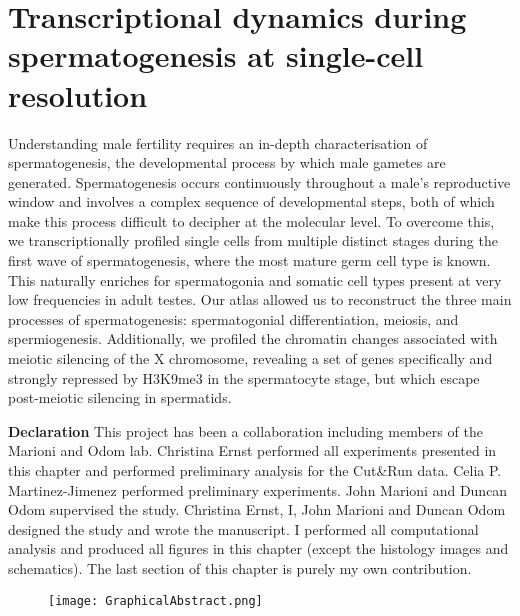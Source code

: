 
\chapter{Transcriptional dynamics during spermatogenesis at single-cell resolution}  

\graphicspath{{Chapter3/Figures/}}

\begin{Abstract}
Understanding male fertility requires an in-depth characterisation of spermatogenesis, the developmental process by which male gametes are generated. Spermatogenesis occurs continuously throughout a male’s reproductive window and involves a complex sequence of developmental steps, both of which make this process difficult to decipher at the molecular level. To overcome this, we transcriptionally profiled single cells from multiple distinct stages during the first wave of spermatogenesis, where the most mature germ cell type is known. This naturally enriches for spermatogonia and somatic cell types present at very low frequencies in adult testes. Our atlas allowed us to reconstruct the three main processes of spermatogenesis: spermatogonial differentiation, meiosis, and spermiogenesis. Additionally, we profiled the chromatin changes associated with meiotic silencing of the X chromosome, revealing a set of genes specifically and strongly repressed by H3K9me3 in the spermatocyte stage, but which escape post-meiotic silencing in spermatids.
\end{Abstract}

\newpage

\begin{Comment}
\textbf{Declaration} This project has been a collaboration including members of the Marioni and Odom lab. Christina Ernst performed all experiments presented in this chapter and performed preliminary analysis for the Cut\&Run data. Celia P. Martinez-Jimenez performed preliminary experiments. John Marioni and Duncan Odom supervised the study. Christina Ernst, I, John Marioni and Duncan Odom designed the study and wrote the manuscript. I performed all computational analysis and produced all figures in this chapter (except the histology images and schematics). The last section of this chapter is purely my own contribution.
\end{Comment}

\begin{figure}[hb]
\centering    
\texttt{[image: GraphicalAbstract.png]}
\caption*{}
\end{figure}


\newpage


\newpage


